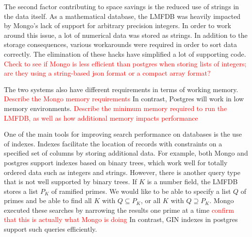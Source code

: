 \documentclass{article}
\newcommand{\todo}[1]{\textcolor{red}{#1}}
\begin{document}
The second factor contributing to space savings is the reduced use of strings in the data itself.  As a mathematical database, the LMFDB was heavily impacted by Mongo's lack of support for arbitrary precision integers.  In order to work around this issue, a lot of numerical data was stored as strings.  In addition to the storage consequences, various workarounds were required in order to sort data correctly.  The elimination of these hacks have simplified a lot of supporting code.  \todo{Check to see if Mongo is less efficient than postgres when storing lists of integers; are they using a string-based json format or a compact array format?}

The two systems also have different requirements in terms of working memory.  \todo{Describe the Mongo memory requirements}  In contrast, Postgres will work in low memory environments.  \todo{Describe the minimum memory required to run the LMFDB, as well as how additional memory impacts performance}

One of the main tools for improving search performance on databases is the use of indexes.  Indexes facilitate the location of records with constraints on a specified set of columns by storing additional data.  For example, both Mongo and postgres support indexes based on binary trees, which work well for totally ordered data such as integers and strings.  However, there is another query type that is not well supported by binary trees.  If $K$ is a number field, the LMFDB stores a list $P_K$ of ramified primes.  We would like to be able to specify a list $Q$ of primes and be able to find all $K$ with $Q \subseteq P_K$, or all $K$ with $Q \supseteq P_K$.  Mongo executed these searches by narrowing the results one prime at a time \todo{confirm that this is actually what Mongo is doing} In contrast, GIN indexes in postgres support such queries efficiently.
\end{document}
